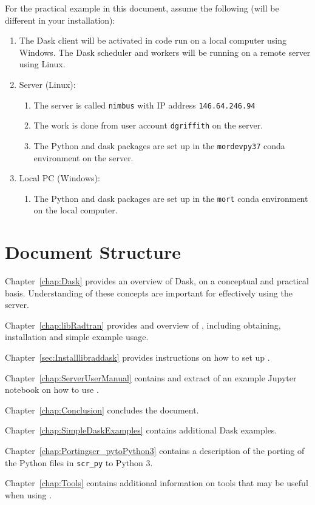 For the practical example in this document, assume the following (will be different in your installation):
\begin{enumerate}
\item The Dask client will be activated in code run on a local computer using Windows.  The Dask scheduler and workers will be running on a remote server using Linux.
\item Server (Linux):
\begin{enumerate}
\item The server is called \lstinline{nimbus} with IP address \lstinline{146.64.246.94}
\item The work is done from  user account \lstinline{dgriffith} on the server.
\item The Python and dask packages are set up in the \lstinline{mordevpy37} conda environment  on the server.
\end{enumerate}

\item Local PC (Windows):
\begin{enumerate}
\item The Python and dask packages are set up in the \lstinline{mort} conda environment  on the local computer.
\end{enumerate}

\end{enumerate}


\section{Document Structure}
\label{sec:DocumentStructure}

Chapter~\ref{chap:Dask} provides an overview of Dask, on a conceptual and practical basis.  Understanding of these concepts are important for effectively using the server.

Chapter~\ref{chap:libRadtran}  provides and overview of \libradtran{}, including obtaining, installation and simple example usage.

Chapter~\ref{sec:Installlibraddask}  provides instructions on how to set up \libraddask{}.

Chapter~\ref{chap:ServerUserManual}  contains and extract of an example Jupyter notebook on how to use  \libraddask{}.

Chapter~\ref{chap:Conclusion} concludes the document.

Chapter~\ref{chap:SimpleDaskExamples} contains additional Dask examples.

Chapter~\ref{chap:Portingscr_pytoPython3}  contains a description of the porting of the \libradtran{} Python files in \lstinline{scr_py} to Python 3.

Chapter~\ref{chap:Tools}  contains additional information on tools that may be useful when using \libraddask{}.
 